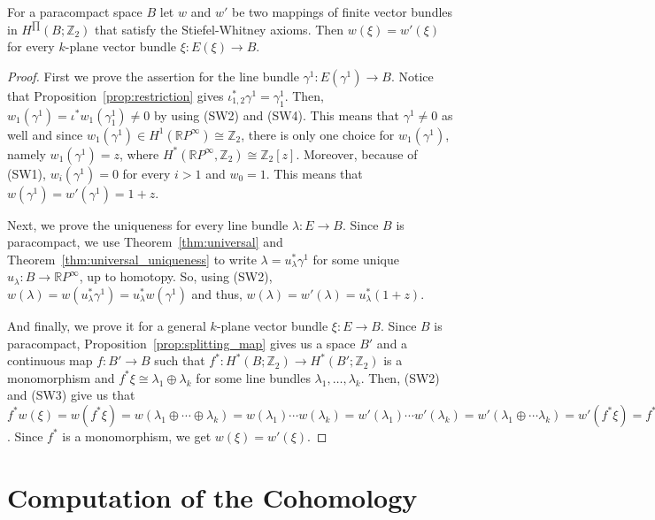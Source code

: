 \begin{theorem} For a paracompact space $B$ let $w$ and $w'$ be two mappings of finite vector bundles in $H^{\prod}(B;\mathbb{Z}_2)$ that satisfy the Stiefel-Whitney axioms. Then $w(\xi)=w'(\xi)$ for every $k$-plane vector bundle $\xi:E(\xi)\to B$.
\end{theorem}
\begin{proof} First we prove the assertion for the line bundle $\gamma^1:E(\gamma^1)\to B$. Notice that Proposition~\ref{prop:restriction} gives $\iota_{1,2}^*\gamma^1=\gamma_1^1$. Then, $w_1(\gamma^1)=\iota^*w_1(\gamma_1^1)\neq0$ by using (SW2) and (SW4). This means that $\gamma^1\neq0$ as well and since $w_1(\gamma^1)\in H^1(\mathbb{R}P^{\infty})\cong\mathbb{Z}_2$, there is only one choice for $w_1(\gamma^1)$, namely $w_1(\gamma^1)=z$, where $H^*(\mathbb{R}P^{\infty},\mathbb{Z}_2)\cong\mathbb{Z}_2[z]$. Moreover, because of (SW1), $w_i(\gamma^1)=0$ for every $i>1$ and $w_0=1$. This means that $w(\gamma^1)=w'(\gamma^1)=1+z$.

Next, we prove the uniqueness for every line bundle $\lambda:E\to B$. Since $B$ is paracompact, we use Theorem~\ref{thm:universal} and Theorem~\ref{thm:universal_uniqueness} to write $\lambda=u_{\lambda}^*\gamma^1$ for some unique $u_{\lambda}:B\to\mathbb{R}P^{\infty}$, up to homotopy. So, using (SW2), $w(\lambda)=w(u_{\lambda}^*\gamma^1)=u_{\lambda}^*w(\gamma^1)$ and thus, $w(\lambda)=w'(\lambda)=u_{\lambda}^*(1+z)$.

And finally, we prove it for a general $k$-plane vector bundle $\xi:E\to B$. Since $B$ is paracompact, Proposition~\ref{prop:splitting_map} gives us a space $B'$ and a continuous map $f:B'\to B$ such that $f^*:H^*(B;\mathbb{Z}_2)\to H^*(B';\mathbb{Z}_2)$ is a monomorphism and $f^*\xi\cong\lambda_1\oplus\lambda_k$ for some line bundles $\lambda_1,\ldots,\lambda_k$. Then, (SW2) and (SW3) give us that $f^*w(\xi)=w(f^*\xi)=w(\lambda_1\oplus\cdots\oplus\lambda_k)=w(\lambda_1)\cdots w(\lambda_k)=w'(\lambda_1)\cdots w'(\lambda_k)=w'(\lambda_1\oplus\cdots\lambda_k)=w'(f^*\xi)=f^*w'(\xi)$. Since $f^*$ is a monomorphism, we get $w(\xi)=w'(\xi)$.
\end{proof}


\section{Computation of the Cohomology}


